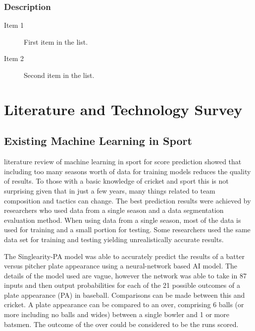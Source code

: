 \documentclass[12pt,a4paper]{report}
\begin{document}
\subsection{Description}

\begin{description}
\item[Item 1]First item in the list.
\item[Item 2]Second item in the list.
\end{description}


\chapter{Literature and Technology Survey}

\section{Existing Machine Learning in Sport}

\citet{horvat2020} literature review of machine learning in sport for score prediction showed that including too many seasons worth of data for training models reduces the quality of results. To those with a basic knowledge of cricket and sport this is not surprising given that in just a few years, many things related to team composition and tactics can change. The best prediction results were achieved by researchers who used data from a single season and a data segmentation evaluation method. When using data from a single season, most of the data is used for training and a small portion for testing. Some researchers used the same data set for training and testing yielding unrealistically accurate results.

The Singlearity-PA model \citep{silver2021baseball} was able to accurately predict the results of a batter versus pitcher plate appearance using a neural-network based AI model. The details of the model used are vague, however the network was able to take in 87 inputs and then output probabilities for each of the 21 possible outcomes of a plate appearance (PA) in baseball. Comparisons can be made between this and cricket. A plate appearance can be compared to an over, comprising 6 balls (or more including no balls and wides) between a single bowler and 1 or more batsmen. The outcome of the over could be considered to be the runs scored. 
\end{document}

